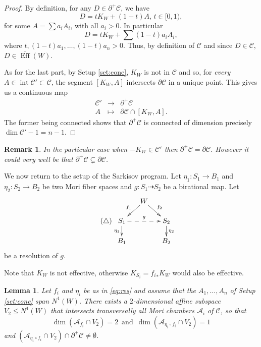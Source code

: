 \documentclass[a4paper,11pt]{amsart}
\newtheorem{lemma}[theorem]{Lemma}
\newtheorem{remark}[theorem]{Remark}
\def\dim{\operatorname{dim}}
\def\Eff{\operatorname{Eff}}
\def\inter{\operatorname{int}}
\newcommand{\Cc}{\mathcal{C}}
\newcommand{\Aa}{\mathcal{A}}
\newcommand{\rmap}{\dashrightarrow}
\begin{document}
\begin{proof}
	By definition, for any $D \in \partial^+\Cc$, we have
	\[
	D = tK_W + (1-t)A, \, t \in [0,1),
	\]
	for some $A = \sum a_i A_i$, with all $a_i > 0$.
	In particular
	\[
	D = tK_W + \sum (1-t)a_i A_i,
	\]
	where $t, (1-t)a_1, \dots, (1-t)a_n > 0$.
	Thus, by definition of $\Cc$ and since $D \in \Cc$, $D \in \overline{\Eff}(W)$.
	
	As for the last part, by Setup \ref{set:cone}, $K_W$ is not in $\Cc$ and so, for \emph{every} $A \in \inter\Cc' \subset \Cc$, the segment $[K_W,A]$ intersects $\partial \Cc$ in a unique point.
	This gives us a continuous map
	\[
	\begin{array}{ccc}
		\Cc' & \to & \partial^+ \Cc\\
		A & \mapsto & \partial \Cc \cap [K_W,A].
	\end{array}
	\]
	The former being connected shows that $\partial^+\Cc$ is connected of dimension precisely $\dim\Cc'-1= n-1$.
\end{proof}
	
\begin{remark}
	In the particular case when $-K_W \in \Cc'$ then $\partial^+\Cc = \partial\Cc$.
	However it could very well be that $\partial^+\Cc \subsetneq \partial\Cc$.
\end{remark}

We now return to the setup of the Sarkisov program.
Let $\eta_1\colon S_1 \to B_1$  and $\eta_2\colon S_2 \to B_2$ be two Mori fiber spaces and $g \colon S_1 \rmap S_2$ be a birational map.
Let 
\begin{equation}\label{eq:res}\tag{$\triangle$}
	\begin{gathered}
		\xymatrix@R=.5cm@C=.5cm{
			&W \ar[ld]_{f_1} \ar[rd]^{f_2} \\
			S_1 \ar[d]_{\eta_1} \ar@{-->}[rr]^g &&S_2 \ar[d]^{\eta_2}\\
			B_1 && B_2
		}
	\end{gathered}
\end{equation}
be a resolution of $g$.
	
Note that $K_W$ is not effective, otherwise $K_{S_i} = {f_i}_*K_W$ would also be effective.


\begin{lemma}\label{lem:dim2subspace}
	Let $f_i$ and $\eta_i$ be as in \eqref{eq:res} and assume that the $A_1,\dots,A_n$ of Setup \ref{set:cone} span $N^1(W)$.
	There exists a $2$-dimensional \emph{affine} subspace $V_2 \leq N^1(W)$ that intersects transversally all Mori chambers $\Aa_i$ of $\Cc$, so that
	\[
	\dim\left(\Aa_{f_i} \cap V_2 \right) = 2 \, \text{ and } \, \dim\left(\Aa_{\eta_i\circ f_i} \cap V_2 \right) = 1
	\]
	and $\left(\Aa_{\eta_i\circ f_i} \cap V_2 \right) \cap \partial^+\Cc \neq \emptyset$. 
\end{lemma}
\end{document}
